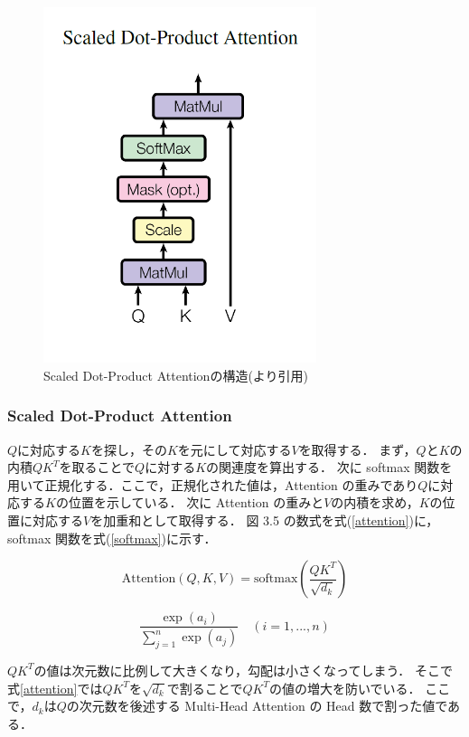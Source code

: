 \begin{figure}[H]
	\centering
	\includegraphics[width=80mm]{image/transformer-scaled-dot-product-attention.png}
	\caption{Scaled Dot-Product Attentionの構造(\cite{bert}より引用)}
	\label{sda}
\end{figure}

\subsubsection{Scaled Dot-Product Attention}
 ${Q}$に対応する${K}$を探し，その${K}$を元にして対応する${V}$を取得する．
まず，${Q}$と${K}$の内積${QK^T}$を取ることで${Q}$に対する${K}$の関連度を算出する．
次に softmax 関数を用いて正規化する．ここで，正規化された値は，Attention の重みであり${Q}$に対応する${K}$の位置を示している．
次に Attention の重みと${V}$の内積を求め，${K}$の位置に対応する${V}$を加重和として取得する．
図 3.5 の数式を式(\ref{attention})に，softmax 関数を式(\ref{softmax})に示す．

\begin{equation}
    \text{Attention}(Q,K,V) = \text{softmax}\left( \frac{QK^T}{\sqrt{d_k}}\right)
    \label{attention}
\end{equation}

\begin{equation}
    \label{softmax}
    \frac{\exp(a_i)}{\sum_{j=1}^{n}\exp(a_j)} \quad(i=1,...,n)
\end{equation}

${QK^T}$の値は次元数に比例して大きくなり，勾配は小さくなってしまう．
そこで式\ref{attention}では${QK^T}$を${\sqrt{d_k}}$で割ることで${QK^T}$の値の増大を防いでいる．
ここで，${d_k}$は${Q}$の次元数を後述する Multi-Head Attention の Head 数で割った値である．

